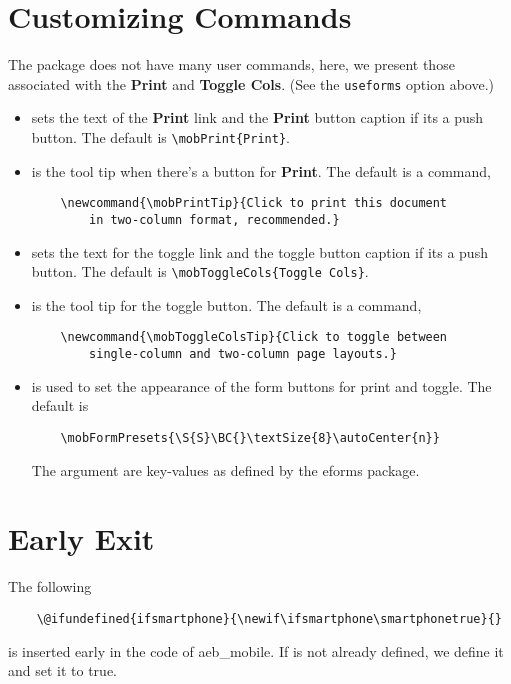 \documentclass{article}
\begin{document}
\section{Customizing Commands}

The package does not have many user commands, here, we present those
associated with the \textbf{Print} and \textbf{Toggle Cols}. (See the
\texttt{useforms} option above.)

\begin{itemize}
    \item {} sets the text of the \textbf{Print} link
        and the \textbf{Print} button caption if its a push button. The
        default is \verb!\mobPrint{Print}!.
    \item {} is the tool tip when there's a button for
    \textbf{Print}. The default is a command,
\begin{verbatim}
    \newcommand{\mobPrintTip}{Click to print this document
        in two-column format, recommended.}
\end{verbatim}
    \item {} sets the text for the toggle link and the
        toggle button caption if its a push button. The default is
        \verb!\mobToggleCols{Toggle Cols}!.
    \item {} is the tool tip for the toggle button.
    The default is a command,
\begin{verbatim}
    \newcommand{\mobToggleColsTip}{Click to toggle between
        single-column and two-column page layouts.}
\end{verbatim}
    \item {} is used to set the appearance of the
        form buttons for print and toggle. The default is
\begin{verbatim}
    \mobFormPresets{\S{S}\BC{}\textSize{8}\autoCenter{n}}
\end{verbatim}
The argument are key-values as defined by the \textsf{eforms} package.
\end{itemize}

\section{Early Exit}

The following
\begin{verbatim}
    \@ifundefined{ifsmartphone}{\newif\ifsmartphone\smartphonetrue}{}
\end{verbatim}
is inserted early in the code of \textsf{aeb\_mobile}. If
 is not already defined, we define it and set it to true.
\end{document}
